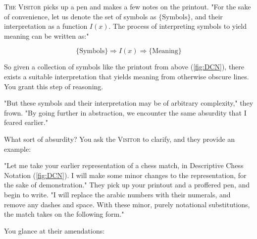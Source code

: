 \textsc{The Visitor} picks up a pen and makes a few notes on the printout. "For the sake of convenience, let us denote the set of symbols as $\{\text{Symbols}\}$, and their interpretation as a function $I(x)$. The process of interpreting symbols to yield meaning can be written as:"

\begin{equation*}
  \{\text{Symbols}\} \Rightarrow I(x) \Rightarrow \{\text{Meaning}\}
\end{equation*}

So given a collection of symbols like the printout from above (\autoref{fig:DCN}), there exists a suitable interpretation that yields meaning from otherwise obscure lines. You grant this step of reasoning.

"But these symbols and their interpretation may be of arbitrary complexity," they frown. "By going further in abstraction, we encounter the same absurdity that I feared earlier."

What sort of absurdity? You ask the \textsc{Visitor} to clarify, and they provide an example:


"Let me take your earlier representation of a chess match, in Descriptive Chess Notation (\autoref{fig:DCN}). I will make some minor changes to the representation, for the sake of demonstration." They pick up your printout and a proffered pen, and begin to write. "I will replace the arabic numbers with their numerals, and remove any dashes and space. With these minor, purely notational substitutions, the match takes on the following form."

You glance at their amendations:



